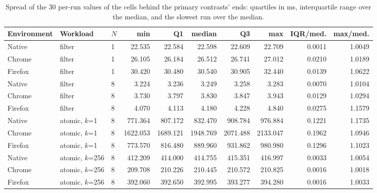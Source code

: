 \begin{table}[htbp]
\caption{Spread of the 30 per-run values of the cells behind the primary contrasts' ends: quartiles in ms, interquartile range over the median, and the slowest run over the median.}\label{tab:distributions}
\centering\footnotesize
\begin{tabular}{lllrrrrrrr}
\toprule
Environment & Workload & $N$ & min & Q1 & median & Q3 & max & IQR/med. & max/med. \\
\midrule
Native & filter & 1 & 22.535 & 22.584 & 22.598 & 22.609 & 22.709 & 0.0011 & 1.0049 \\
Chrome & filter & 1 & 26.105 & 26.184 & 26.512 & 26.741 & 27.012 & 0.0210 & 1.0189 \\
Firefox & filter & 1 & 30.420 & 30.480 & 30.540 & 30.905 & 32.440 & 0.0139 & 1.0622 \\
Native & filter & 8 & 3.224 & 3.236 & 3.249 & 3.258 & 3.283 & 0.0070 & 1.0104 \\
Chrome & filter & 8 & 3.730 & 3.797 & 3.830 & 3.847 & 3.943 & 0.0129 & 1.0294 \\
Firefox & filter & 8 & 4.070 & 4.113 & 4.180 & 4.228 & 4.840 & 0.0275 & 1.1579 \\
Native & atomic, $k$=1 & 8 & 771.364 & 807.172 & 832.470 & 908.784 & 976.884 & 0.1221 & 1.1735 \\
Chrome & atomic, $k$=1 & 8 & 1622.053 & 1689.121 & 1948.769 & 2071.488 & 2133.047 & 0.1962 & 1.0946 \\
Firefox & atomic, $k$=1 & 8 & 773.570 & 816.480 & 889.960 & 931.862 & 980.980 & 0.1296 & 1.1023 \\
Native & atomic, $k$=256 & 8 & 412.209 & 414.000 & 414.755 & 415.351 & 416.997 & 0.0033 & 1.0054 \\
Chrome & atomic, $k$=256 & 8 & 209.708 & 210.226 & 210.445 & 210.572 & 210.825 & 0.0016 & 1.0018 \\
Firefox & atomic, $k$=256 & 8 & 392.060 & 392.650 & 392.995 & 393.277 & 394.280 & 0.0016 & 1.0033 \\
\bottomrule
\end{tabular}
\end{table}
